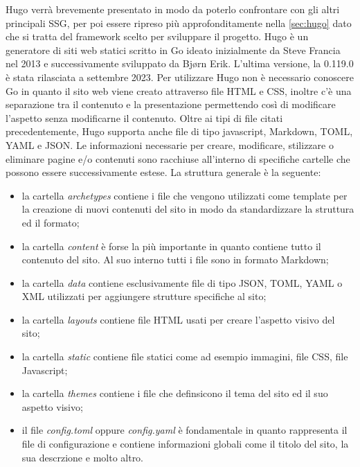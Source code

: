 \documentclass[target=bach,aauheader=]{thud}
\begin{document}
Hugo verrà brevemente presentato in modo da poterlo confrontare con gli altri principali SSG, per poi essere ripreso più approfonditamente nella \cref{sec:hugo} dato che si tratta del framework scelto per sviluppare il progetto. \newline
Hugo è un generatore di siti web statici scritto in Go ideato inizialmente da Steve Francia nel 2013 e successivamente sviluppato da Bjørn Erik. L'ultima versione, la 0.119.0 è stata rilasciata a settembre 2023.
Per utilizzare Hugo non è necessario conoscere Go in quanto il sito web viene creato attraverso file HTML e CSS, inoltre c'è una separazione tra il contenuto e la presentazione permettendo così di modificare l'aspetto senza modificarne il contenuto. 
Oltre ai tipi di file citati precedentemente, Hugo supporta anche file di tipo javascript, Markdown, TOML, YAML e JSON. \newline
Le informazioni necessarie per creare, modificare, stilizzare o eliminare pagine e/o contenuti sono racchiuse all'interno di specifiche cartelle che possono essere successivamente estese. La struttura generale è la seguente:
\begin{itemize}
    \item la cartella \textit{archetypes} contiene i file che vengono utilizzati come template per la creazione di nuovi contenuti del sito in modo da standardizzare la struttura ed il formato;
    \item la cartella \textit{content} è forse la più importante in quanto contiene tutto il contenuto del sito. Al suo interno tutti i file sono in formato Markdown;
    \item la cartella \textit{data} contiene esclusivamente file di tipo JSON, TOML, YAML o XML utilizzati per aggiungere strutture specifiche al sito;
    \item la cartella \textit{layouts} contiene file HTML usati per creare l'aspetto visivo del sito;
    \item la cartella \textit{static} contiene file statici come ad esempio immagini, file CSS, file Javascript;
    \item la cartella \textit{themes} contiene i file che definsicono il tema del sito ed il suo aspetto visivo;
    \item il file \textit{config.toml} oppure \textit{config.yaml} è fondamentale in quanto rappresenta il file di configurazione e contiene informazioni globali come il titolo del sito, la sua descrzione e molto altro.
\end{itemize}
\end{document}
